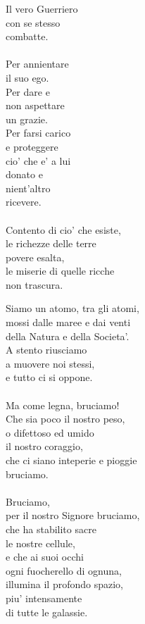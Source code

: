 \begin{haiku}
Il vero Guerriero\\
con se stesso\\
combatte.\\
\leavevmode\\
Per annientare \\
    il suo ego.\\
Per dare e \\
    non aspettare \\
    un grazie.\\
Per farsi carico\\
e proteggere\\
cio' che e' a lui\\
donato e\\
nient'altro \\
ricevere.\\
\leavevmode\\
Contento di cio' che esiste,\\
le richezze delle terre\\
povere esalta,\\
le miserie di quelle ricche\\
non trascura.\\
\end{haiku}


\begin{haiku}
    Siamo un atomo, tra gli atomi,\\
    mossi dalle maree e dai venti \\
    della Natura e della Societa'.\\
    A stento riusciamo \\
    a muovere noi stessi,\\
    e tutto ci si oppone.\\
    \leavevmode\\
    Ma come legna, bruciamo!\\
    Che sia poco il nostro peso,\\
    o difettoso ed umido\\
    il nostro coraggio,\\
    che ci siano inteperie e pioggie\\
    bruciamo.\\
    \leavevmode\\
    Bruciamo, \\
    per il nostro Signore bruciamo,\\
    che ha stabilito sacre\\
    le nostre cellule,\\
    e che ai suoi occhi \\
    ogni fuocherello di ognuna,\\
    illumina il profondo spazio,\\
    piu' intensamente \\
    di tutte le galassie.\\
\end{haiku}



